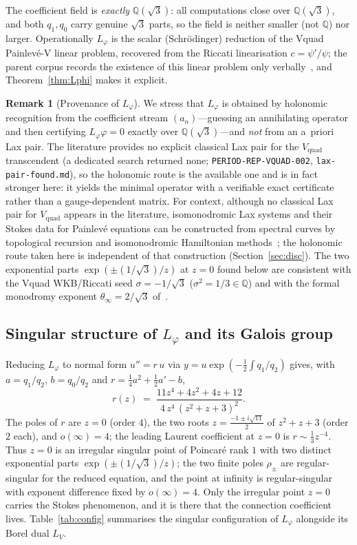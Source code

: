 \documentclass[11pt,reqno]{amsart}
\renewcommand{\_}{\vquadorigunderscore\allowbreak}
\theoremstyle{plain}
\theoremstyle{definition}
\newtheorem{remark}[theorem]{Remark}
\newcommand{\Vquad}{V_{\mathrm{quad}}}
\newcommand{\Lphi}{L_{\varphi}}
\newcommand{\LV}{L_{V}}
\newcommand{\Qsqrt}{\mathbb{Q}(\sqrt3)}
\begin{document}
The coefficient field is \emph{exactly} $\Qsqrt$: all computations close over $\Qsqrt$, and both
$q_1,q_0$ carry genuine $\sqrt3$ parts, so the field is neither smaller (not $\mathbb{Q}$) nor
larger. Operationally $\Lphi$ is the scalar (Schr\"odinger) reduction of the V\_quad Painlev\'e-V
linear problem, recovered from the Riccati linearisation $c=\psi'/\psi$; the parent corpus
records the existence of this linear problem only verbally~\cite{Vquad}, and Theorem~\ref{thm:Lphi}
makes it explicit.

\begin{remark}[Provenance of $\Lphi$]\label{rmk:provenance}
We stress that $\Lphi$ is obtained by holonomic recognition from the coefficient stream
$(a_n)$---guessing an annihilating operator and then certifying $\Lphi\varphi=0$ exactly over
$\Qsqrt$---and \emph{not} from an a~priori Lax pair. The literature provides no explicit classical
Lax pair for the $\Vquad$ transcendent (a dedicated search returned none;
\texttt{PERIOD-REP-VQUAD-002}, \texttt{lax-pair-found.md}), so the holonomic route is the available
one and is in fact stronger here: it yields the minimal operator with a verifiable exact
certificate rather than a gauge-dependent matrix. For context, although no classical Lax pair for
$\Vquad$ appears in the literature, isomonodromic Lax systems and their Stokes data for
Painlev\'e equations can be constructed from spectral curves by topological recursion and
isomonodromic Hamiltonian methods~\cite{MarchalOrantin,IwakiMarchalSaenz,MarchalAlameddine}; the
holonomic route taken here is independent of that construction (Section~\ref{sec:disc}). The two
exponential parts
$\exp(\pm(1/\sqrt3)/z)$ at $z=0$ found below are consistent with the V\_quad WKB/Riccati seed
$\sigma=-1/\sqrt3$ ($\sigma^2=1/3\in\mathbb{Q}$) and with the formal monodromy exponent
$\theta_\infty=2/\sqrt3$ of~\cite{Vquad}.
\end{remark}

\subsection{Singular structure of \texorpdfstring{$\Lphi$}{Lphi} and its Galois group}
Reducing $\Lphi$ to normal form $u''=r\,u$ via $y=u\exp(-\tfrac12\int q_1/q_2)$ gives, with
$a=q_1/q_2$, $b=q_0/q_2$ and $r=\tfrac14a^2+\tfrac12a'-b$,
\begin{equation}\label{eq:r}
  r(z)\;=\;\frac{11z^4+4z^2+4z+12}{\,4\,z^4\,(z^2+z+3)^2\,}.
\end{equation}
The poles of $r$ are $z=0$ (order $4$), the two roots $z=\tfrac{-1\pm i\sqrt{11}}2$ of $z^2+z+3$
(order $2$ each), and $o(\infty)=4$; the leading Laurent coefficient at $z=0$ is
$r\sim\tfrac13 z^{-4}$. Thus $z=0$ is an irregular singular point of Poincar\'e rank $1$ with two
distinct exponential parts $\exp(\pm(1/\sqrt3)/z)$; the two finite poles $\rho_\pm$ are
regular-singular for the reduced equation, and the point at infinity is regular-singular with
exponent difference fixed by $o(\infty)=4$. Only the irregular point $z=0$ carries the Stokes
phenomenon, and it is there that the connection coefficient lives. Table~\ref{tab:config}
summarises the singular configuration of $\Lphi$ alongside its Borel dual $\LV$.
\end{document}
